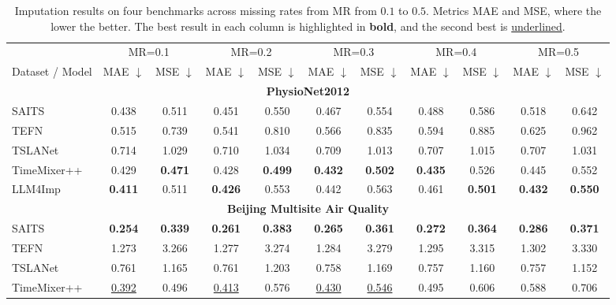 \documentclass[conference]{IEEEtran}
\begin{document}
\begin{table}[!ht]
\centering
\caption{Imputation results on four benchmarks across missing rates from MR from $0.1$ to $0.5$. Metrics MAE and MSE, where the lower the better. The best result in each column is highlighted in \textbf{bold}, and the second best is \underline{underlined}.}
\label{tab:main-results}
\begin{tabular}{lcccccccccc}
\toprule
& \multicolumn{2}{c}{MR=0.1} & \multicolumn{2}{c}{MR=0.2} & \multicolumn{2}{c}{MR=0.3} & \multicolumn{2}{c}{MR=0.4} & \multicolumn{2}{c}{MR=0.5} \\
\cmidrule(lr){2-3}\cmidrule(lr){4-5}\cmidrule(lr){6-7}\cmidrule(lr){8-9}\cmidrule(lr){10-11}
Dataset / Model & MAE $\downarrow$ & MSE $\downarrow$ & MAE $\downarrow$ & MSE $\downarrow$ & MAE $\downarrow$ & MSE $\downarrow$ & MAE $\downarrow$ & MSE $\downarrow$ & MAE $\downarrow$ & MSE $\downarrow$ \\
\midrule
\multicolumn{11}{c}{\textbf{PhysioNet2012}}\\
SAITS        & 0.438 & 0.511 & 0.451 & 0.550 & 0.467 & 0.554 & 0.488 & 0.586 & 0.518 & 0.642 \\
TEFN         & 0.515 & 0.739 & 0.541 & 0.810 & 0.566 & 0.835 & 0.594 & 0.885 & 0.625 & 0.962 \\
TSLANet      & 0.714 & 1.029 & 0.710 & 1.034 & 0.709 & 1.013 & 0.707 & 1.015 & 0.707 & 1.031 \\
TimeMixer++  & 0.429 & \textbf{0.471} & 0.428 & \textbf{0.499} & \textbf{0.432} & \textbf{0.502} & \textbf{0.435} & 0.526 & 0.445 & 0.552 \\
LLM4Imp      & \textbf{0.411} & 0.511 & \textbf{0.426} & 0.553 & 0.442 & 0.563 & 0.461 & \textbf{0.501} & \textbf{0.432} & \textbf{0.550} \\
\midrule
\multicolumn{11}{c}{\textbf{Beijing Multisite Air Quality}}\\
SAITS        & \textbf{0.254} & \textbf{0.339} & \textbf{0.261} & \textbf{0.383} & \textbf{0.265} & \textbf{0.361} & \textbf{0.272} & \textbf{0.364} & \textbf{0.286} & \textbf{0.371} \\
TEFN         & 1.273 & 3.266 & 1.277 & 3.274 & 1.284 & 3.279 & 1.295 & 3.315 & 1.302 & 3.330 \\
TSLANet      & 0.761 & 1.165 & 0.761 & 1.203 & 0.758 & 1.169 & 0.757 & 1.160 & 0.757 & 1.152 \\
TimeMixer++  & \underline{0.392} & 0.496 & \underline{0.413} & 0.576 & \underline{0.430} & \underline{0.546} & 0.495 & 0.606 & 0.588 & 0.706 \\

\end{tabular}
\end{table}
\end{document}

